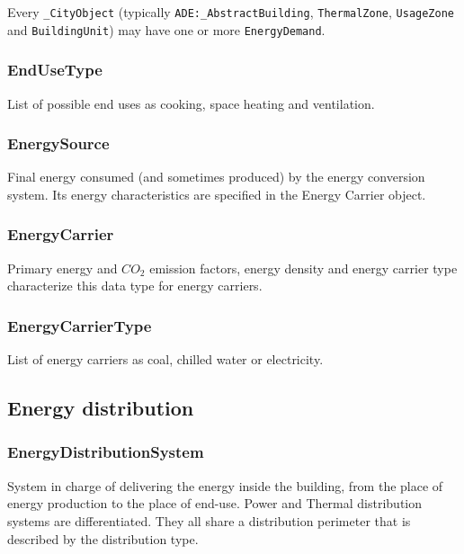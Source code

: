 \documentclass[a4paper,12pt]{article}
\begin{document}
Every \lstinline!_CityObject! (typically
\lstinline!ADE:_AbstractBuilding!, \lstinline!ThermalZone!,
\lstinline!UsageZone! and \lstinline!BuildingUnit!) may have one or more
\lstinline!EnergyDemand!.

\subsubsection{EndUseType}\label{endusetype}

List of possible end uses as cooking, space heating and ventilation.

\subsubsection{EnergySource}\label{energysource}

Final energy consumed (and sometimes produced) by the energy conversion
system. Its energy characteristics are specified in the Energy Carrier
object.

\subsubsection{EnergyCarrier}\label{energycarrier}

Primary energy and \(CO_2\) emission factors, energy density and energy
carrier type characterize this data type for energy carriers.

\subsubsection{EnergyCarrierType}\label{energycarriertype}

List of energy carriers as coal, chilled water or electricity.

\subsection{Energy distribution}\label{energy-distribution}

\subsubsection{EnergyDistributionSystem}\label{energydistributionsystem}

System in charge of delivering the energy inside the building, from the
place of energy production to the place of end-use. Power and Thermal
distribution systems are differentiated. They all share a distribution
perimeter that is described by the distribution type.
\end{document}
